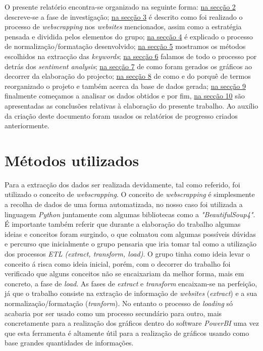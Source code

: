 O presente relatório encontra-se organizado na seguinte forma: \hyperref[cap2]{na secção 2} descreve-se a fase de investigação; \hyperref[cap3]{na secção 3} é descrito como foi realizado o processo de \textit{webscrapping} nos \textit{websites} mencionados, assim como a estratégia pensada e dividida pelos elementos do grupo; \hyperref[cap4]{na secção 4} é explicado o processo de normalização/formatação desenvolvido; \hyperref[cap5]{na secção 5} mostramos os métodos escolhidos na extracção das \textit{keywords}; \hyperref[cap6]{na secção 6} falamos de todo o processo por detrás dos \textit{sentiment analysis}; \hyperref[cap7]{na secção 7} de como foram gerados os gráficos ao decorrer da elaboração do projecto; \hyperref[cap8]{na secção 8} de como e do porquê de termos reorganizado o projeto e também acerca da base de dados gerada; \hyperref[cap9]{na secção 9} finalmente começamos a analisar os dados obtidos e por fim, \hyperref[cap10]{na secção 10} são apresentadas as conclusões relativas à elaboração do presente trabalho. Ao auxílio da criação deste documento foram usados os relatórios de progresso criados anteriormente.

\section{Métodos utilizados}
Para a extracção dos dados ser realizada devidamente, tal como referido, foi utilizado o conceito de \textit{webscrapping}. O conceito de \textit{webscrapping} é simplesmente a recolha de dados de uma forma automatizada, no nosso caso foi utilizada a linguagem \textit{Python} juntamente com algumas bibliotecas como a \textit{"BeautifulSoup4"}. É importante também referir que durante a elaboração do trabalho algumas ideias e conceitos foram surgindo, o que colmatou com algumas possíveis dúvidas e percurso que inicialmente o grupo pensaria que iria tomar tal como a utilização dos processos \textit{ETL (extract, transform, load)}. O grupo tinha como ideia levar o conceito á risca como ideia inicial, porém, com o decorrer do trabalho foi verificado que alguns conceitos não se encaixariam da melhor forma, mais em concreto, a fase de \textit{load}. As fases de \textit{extract} e \textit{transform} encaixam-se na perfeição, já que o trabalho consiste na extração de informação de \textit{websites} (\textit{extract}) e a sua normalização/formatação (\textit{tranform}). No entanto o processo de \textit{loading} só acabaria por ser usado como um processo secundário para outro, mais concretamente para a realização dos gráficos dentro do software \textit{PowerBI} uma vez que esta ferramenta é altamente útil para a realização de gráficos usando como base grandes quantidades de informações.

